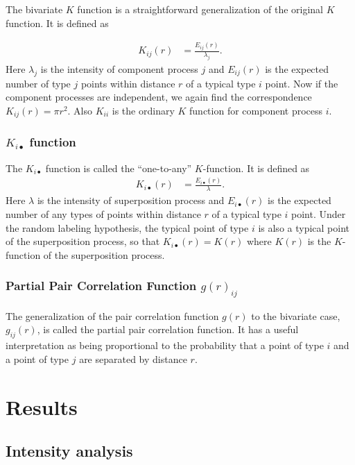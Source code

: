 \documentclass[12pt,a4paper,oneside,article]{memoir}
\begin{document}
The bivariate $K$ function is a straightforward generalization of the original $K$
function. It is defined as 

\begin{align}
	K_{ij}(r)&=\frac{E_{ij}(r)}{\lambda_j}.
	\label{eq:Kij}
\end{align}
Here $\lambda_j$ is the intensity of component process $j$ and $E_{ij}(r)$ is the expected
number of type $j$ points within distance $r$ of a typical type $i$ point. Now if the
component processes are independent, we again find the correspondence $K_{ij}(r)=\pi r^2$.
Also $K_{ii}$ is the ordinary $K$ function for component process $i$.


\subsubsection{$K_{i\bullet}$ function}

The $K_{i\bullet}$ function is called the ``one-to-any'' $K$-function. It is defined as
\begin{align}
	K_{i\bullet}(r)&=\frac{E_{i\bullet}(r)}{\lambda}.
	\label{eq:Kij}
\end{align}
Here $\lambda$ is the intensity of superposition process and $E_{i\bullet}(r)$ is the expected
number of any types of points within distance $r$ of a typical type $i$ point. Under the random
labeling hypothesis, the typical point of type $i$ is also a typical point of the superposition
process, so that $K_{i\bullet}(r)=K(r)$ where $K(r)$ is the $K$-function of the superposition process.

\subsubsection{Partial Pair Correlation Function $g(r)_{ij}$}

The generalization of the pair correlation function $g(r)$ to the bivariate
case, $g_{ij}(r)$, is called the partial pair correlation function. It has a useful
interpretation as being proportional to the probability that a point of type $i$
and a point of type $j$ are separated by distance $r$.


\section{Results}

\subsection{Intensity analysis}
\end{document}
